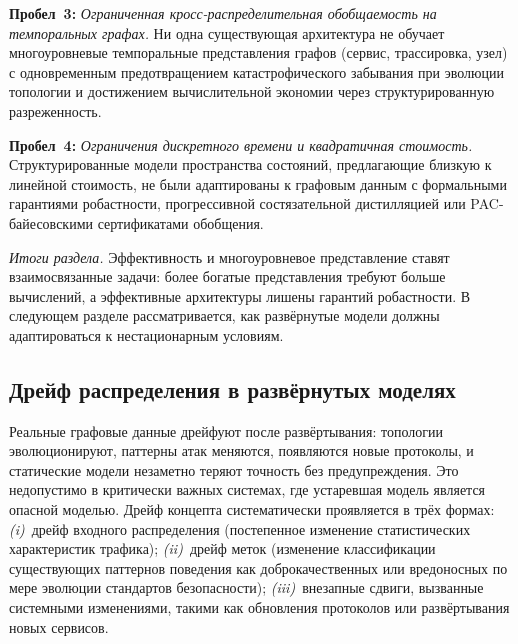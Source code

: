 \noindent\textbf{Пробел~3:} \emph{Ограниченная кросс-распределительная обобщаемость на темпоральных графах.} Ни одна существующая архитектура не обучает многоуровневые темпоральные представления графов (сервис, трассировка, узел) с одновременным предотвращением катастрофического забывания при эволюции топологии и достижением вычислительной экономии через структурированную разреженность.

\medskip
\noindent\textbf{Пробел~4:} \emph{Ограничения дискретного времени и квадратичная стоимость.} Структурированные модели пространства состояний, предлагающие близкую к линейной стоимость, не были адаптированы к графовым данным с формальными гарантиями робастности, прогрессивной состязательной дистилляцией или PAC-байесовскими сертификатами обобщения.

\medskip
\noindent\textit{Итоги раздела.} Эффективность и многоуровневое представление ставят взаимосвязанные задачи: более богатые представления требуют больше вычислений, а эффективные архитектуры лишены гарантий робастности. В следующем разделе рассматривается, как развёрнутые модели должны адаптироваться к нестационарным условиям.

\label{sec:nonstationarity}%

\subsection{Дрейф распределения в развёрнутых моделях}

Реальные графовые данные дрейфуют после развёртывания: топологии эволюционируют, паттерны атак меняются, появляются новые протоколы, и статические модели незаметно теряют точность без предупреждения. Это недопустимо в критически важных системах, где устаревшая модель является опасной моделью. Дрейф концепта систематически проявляется в трёх формах: \emph{(i)}~дрейф входного распределения (постепенное изменение статистических характеристик трафика); \emph{(ii)}~дрейф меток (изменение классификации существующих паттернов поведения как доброкачественных или вредоносных по мере эволюции стандартов безопасности); \emph{(iii)}~внезапные сдвиги, вызванные системными изменениями, такими как обновления протоколов или развёртывания новых сервисов.


